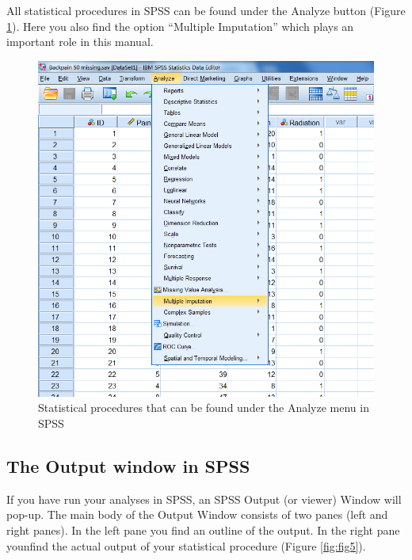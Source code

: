 \documentclass[]{book}
\begin{document}
All statistical procedures in SPSS can be found under the Analyze button
(Figure \ref{fig:fig4}). Here you also find the option ``Multiple
Imputation'' which plays an important role in this manual.

\begin{figure}

{\centering \includegraphics[width=0.95\linewidth]{images/fig1.4} 

}

\caption{Statistical procedures that can be found under the Analyze menu in SPSS}\label{fig:fig4}
\end{figure}

\subsection{The Output window in SPSS}\label{the-output-window-in-spss}

If you have run your analyses in SPSS, an SPSS Output (or viewer) Window
will pop-up. The main body of the Output Window consists of two panes
(left and right panes). In the left pane you find an outline of the
output. In the right pane younfind the actual output of your statistical
procedure (Figure \ref{fig:fig5}).
\end{document}
